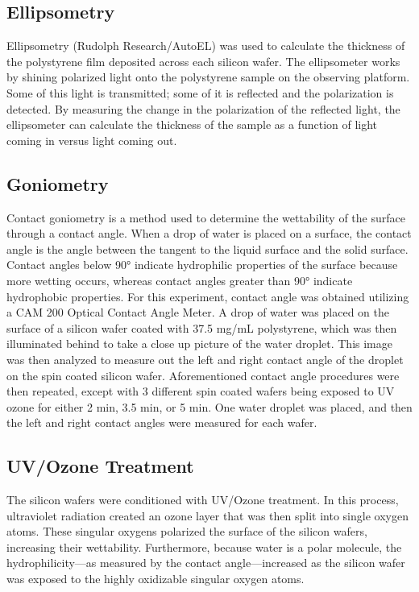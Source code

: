 \documentclass[twocolumn]{article}
\begin{document}
            \subsection{Ellipsometry}
                Ellipsometry (Rudolph Research/AutoEL) was used to calculate the thickness of the polystyrene film deposited across each silicon wafer. The ellipsometer works by shining polarized light onto the polystyrene sample on the observing platform. Some of this light is transmitted; some of it is reflected and the polarization is detected. By measuring the change in the polarization of the reflected light, the ellipsometer can calculate the thickness of the sample as a function of light coming in versus light coming out.

            \subsection{Goniometry}
                Contact goniometry is a method used to determine the wettability of the surface through a contact angle. When a drop of water is placed on a surface, the contact angle is the angle between the tangent to the liquid surface and the solid surface. Contact angles below 90° indicate hydrophilic properties of the surface because more wetting occurs, whereas contact angles greater than 90° indicate hydrophobic properties. For this experiment, contact angle was obtained utilizing a CAM 200 Optical Contact Angle Meter. A drop of water was placed on the surface of a silicon wafer coated with 37.5 mg/mL polystyrene, which was then illuminated behind to take a close up picture of the water droplet. This image was then analyzed to measure out the left and right contact angle of the droplet on the spin coated silicon wafer. Aforementioned contact angle procedures were then repeated, except with 3 different spin coated wafers being exposed to UV ozone for either 2 min, 3.5 min, or 5 min. One water droplet was placed, and then the left and right contact angles were measured for each wafer. 
            
            \subsection{UV/Ozone Treatment}
                The silicon wafers were conditioned with UV/Ozone treatment. In this process, ultraviolet radiation created an ozone layer that was then split into single oxygen atoms. These singular oxygens polarized the surface of the silicon wafers, increasing their wettability. Furthermore, because water is a polar molecule, the hydrophilicity—as measured by the contact angle—increased as the silicon wafer was exposed to the highly oxidizable singular oxygen atoms. 
\end{document}

